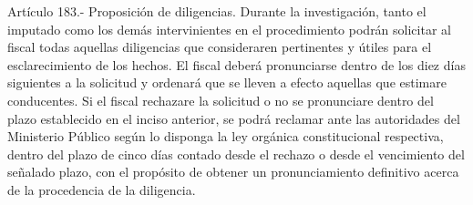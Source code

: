     Artículo 183.- Proposición de diligencias. Durante la investigación, tanto el imputado como los demás intervinientes en el procedimiento podrán solicitar al fiscal todas aquellas diligencias que consideraren pertinentes y útiles para el esclarecimiento de los hechos. El fiscal deberá pronunciarse dentro de los diez días siguientes a la solicitud y ordenará que se lleven a efecto aquellas que estimare conducentes.
    Si el fiscal rechazare la solicitud o no se pronunciare dentro del plazo establecido en el inciso anterior, se podrá reclamar ante las autoridades del Ministerio Público según lo disponga la ley orgánica constitucional respectiva, dentro del plazo de cinco días contado desde el rechazo o desde el vencimiento del señalado plazo, con el propósito de obtener un pronunciamiento definitivo acerca de la procedencia de la diligencia.

